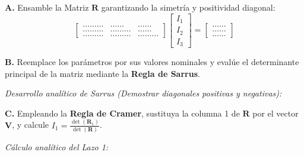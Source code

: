 \documentclass[11pt,a4paper]{article}
\begin{document}
\textbf{A.} Ensamble la Matriz $\mathbf{R}$ garantizando la simetría y positividad diagonal:
\vspace{0.3cm}
$$
\begin{bmatrix}
 \dots \dots \dots & \dots \dots & \dots \dots \\
 \dots \dots \dots & \dots \dots \dots & \dots \dots \\
 \dots \dots \dots & \dots \dots \dots & \dots \dots \dots
\end{bmatrix}
\begin{bmatrix}
 I_1 \\
 I_2 \\
 I_3
\end{bmatrix}
=
\begin{bmatrix}
 \dots \dots \\
 \dots \dots \\
 \dots \dots
\end{bmatrix}
$$
\vspace{0.3cm}

\textbf{B.} Reemplace los parámetros por sus valores nominales y evalúe el determinante principal de la matriz mediante la \textbf{Regla de Sarrus}.

\begin{tcolorbox}[colback=white,colframe=UCBgray,height=4.5cm,valign=top]
\textit{Desarrollo analítico de Sarrus (Demostrar diagonales positivas y negativas):}
\end{tcolorbox}

\textbf{C.} Empleando la \textbf{Regla de Cramer}, sustituya la columna 1 de $\mathbf{R}$ por el vector $\mathbf{V}$, y calcule $I_1 = \frac{\det(\mathbf{R}_1)}{\det(\mathbf{R})}$.

\begin{tcolorbox}[colback=white,colframe=UCBgray,height=4cm,valign=top]
\textit{Cálculo analítico del Lazo 1:}
\end{tcolorbox}
\end{document}
